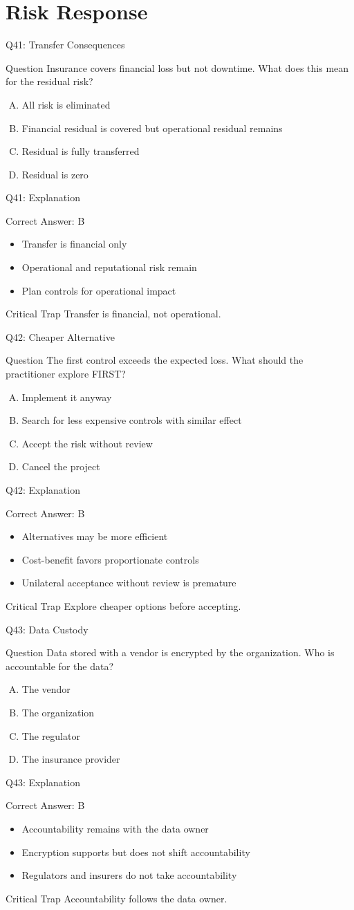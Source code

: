 \documentclass[aspectratio=169]{beamer}
\newcommand{\hq}[7]{%
	\begin{frame}{Q#1: #2}
		\begin{block}{Question}
			#3
		\end{block}
		\begin{enumerate}[(A)]
			#4
		\end{enumerate}
	\end{frame}
	\begin{frame}{Q#1: Explanation}
		\begin{block}{Correct Answer: #5}
			\begin{itemize}
				#6
			\end{itemize}
		\end{block}
		\begin{alertblock}{Critical Trap}
			#7
		\end{alertblock}
	\end{frame}
}
\begin{document}
	\section{Risk Response}
	
	\hq{41}{Transfer Consequences}
	{Insurance covers financial loss but not downtime. What does this mean for the residual risk?}
	{\item All risk is eliminated
		\item Financial residual is covered but operational residual remains
		\item Residual is fully transferred
		\item Residual is zero}
	{B}
	{\item Transfer is financial only
		\item Operational and reputational risk remain
		\item Plan controls for operational impact}
	{Transfer is financial, not operational.}
	
	\hq{42}{Cheaper Alternative}
	{The first control exceeds the expected loss. What should the practitioner explore FIRST?}
	{\item Implement it anyway
		\item Search for less expensive controls with similar effect
		\item Accept the risk without review
		\item Cancel the project}
	{B}
	{\item Alternatives may be more efficient
		\item Cost-benefit favors proportionate controls
		\item Unilateral acceptance without review is premature}
	{Explore cheaper options before accepting.}
	
	\hq{43}{Data Custody}
	{Data stored with a vendor is encrypted by the organization. Who is accountable for the data?}
	{\item The vendor
		\item The organization
		\item The regulator
		\item The insurance provider}
	{B}
	{\item Accountability remains with the data owner
		\item Encryption supports but does not shift accountability
		\item Regulators and insurers do not take accountability}
	{Accountability follows the data owner.}
	
\end{document}
